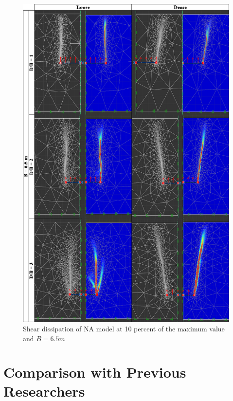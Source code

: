 \documentclass[a4paper, nobind]{templates/ociamthesis}
\begin{document}
\begin{figure}[H]
\includegraphics[width=1\linewidth]{myfigureeeeee/G_six_point_five} \caption{Shear dissipation of NA model at 10 percent of the maximum value and $B = 6.5m$}\label{fig:unnamed-chunk-30}
\end{figure}

\hypertarget{comparison-with-previous-researchers}{%
\section{Comparison with Previous Researchers}\label{comparison-with-previous-researchers}}
\end{document}
